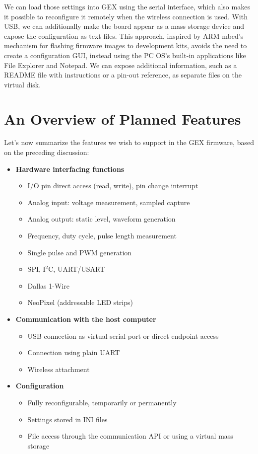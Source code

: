We can load those settings into GEX using the serial interface, which also makes it possible to reconfigure it remotely when the wireless connection is used. With USB, we can additionally make the board appear as a mass storage device and expose the configuration as text files. This approach, inspired by ARM mbed's mechanism for flashing firmware images to development kits, avoids the need to create a configuration GUI, instead using the PC OS's built-in applications like File Explorer and Notepad. We can expose additional information, such as a README file with instructions or a pin-out reference, as separate files on the virtual disk.

\section{An Overview of Planned Features}

Let's now summarize the features we wish to support in the GEX firmware, based on the preceding discussion:

\begin{itemize}
	\item \textbf{Hardware interfacing functions}
		\begin{itemize}	
			\item I/O pin direct access (read, write), pin change interrupt
			\item Analog input: voltage measurement, sampled capture
			\item Analog output: static level, waveform generation
			\item Frequency, duty cycle, pulse length measurement
			\item Single pulse and PWM generation
			\item SPI, I$^2$C, UART/USART
			\item Dallas 1-Wire
			\item NeoPixel (addressable LED strips)	
		\end{itemize}
	\pagebreak[0]
	\item \textbf{Communication with the host computer}
		\begin{itemize}
			\item USB connection as virtual serial port or direct endpoint access
			\item Connection using plain UART
			\item Wireless attachment
		\end{itemize}
	\item \textbf{Configuration}
		\begin{itemize}
			\item Fully reconfigurable, temporarily or permanently
			\item Settings stored in INI files
			\item File access through the communication API or using a virtual mass storage
		\end{itemize}
\end{itemize}

